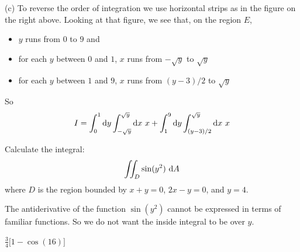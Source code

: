 \begin{solution}
(c) To reverse the order of integration we use horizontal strips
as in the figure on the right above. Looking at that figure, we see that,
on the region $E$,
\begin{itemize}
\item
 $y$ runs from $0$ to $9$ and
\item
 for each $y$ between $0$ and $1$, $x$ runs from $-\sqrt{y}$ to $\sqrt{y}$
\item
 for each $y$ between $1$ and $9$, $x$ runs from $(y-3)/2$ to $\sqrt{y}$
\end{itemize}
So
\begin{align*}
I = \int_0^1\mathrm{d}y \int_{-\sqrt{y}}^{\sqrt{y}}\mathrm{d}x\ x
    +\int_1^9\mathrm{d}y \int_{(y-3)/2}^{\sqrt{y}}\mathrm{d}x\ x
\end{align*}
\end{solution}

\begin{question}[M200 2008A] %
Calculate the integral:
\begin{equation*}
\iint_D \sin(y^2)\ \mathrm{d}A
\end{equation*}
where $D$ is the region bounded by $x + y = 0$, $2x - y = 0$, and $y = 4$.
\end{question}

\begin{hint}
The antiderivative of the function $\sin(y^2)$ cannot be expressed
in terms of familiar functions. So we do not want the inside integral to 
be over $y$.
\end{hint}

\begin{answer}
$\frac{3}{4}\big[1-\cos(16)\big]$
\end{answer}

